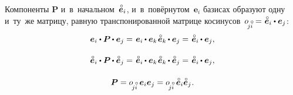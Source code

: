 \begin{otherlanguage}{russian}
\vspace{-0.32em} \noindent {}

Компоненты ${\bm{P}}$ и~в~начальном~${\mathcircabove{\bm{e}}_i}$, и~в~повёрнутом~${\bm{e}_i}$ базисах образуют одну и~ту~же матрицу, равную транспонированной матрице косинусов~${\cosinematrix{\!j\mathcircabove{i}} = \hspace{.12ex} \mathcircabove{\bm{e}}_i \dotp \bm{e}_j}$\hspace{0.1ex}:
\begin{equation}\label{componentsofrotationtensor}
\begin{array}{c}
\bm{e}_i \dotp \bm{P} \hspace{-0.12ex} \dotp \bm{e}_j =
\hspace{0.2ex} \tikzmark{beginEqualsKroneckerDeltaPresent} \bm{e}_i \hspace{-0.1ex} \dotp \bm{e}_k \tikzmark{endEqualsKroneckerDeltaPresent} \hspace{0.2ex} \mathcircabove{\bm{e}}_k \hspace{-0.12ex} \dotp \bm{e}_j =
\hspace{0.2ex} \mathcircabove{\bm{e}}_i \hspace{-0.12ex} \dotp \bm{e}_j , \\[1.4em]
%
\mathcircabove{\bm{e}}_i \dotp \bm{P} \hspace{-0.12ex} \dotp \mathcircabove{\bm{e}}_j =
\hspace{0.2ex} \mathcircabove{\bm{e}}_i \hspace{-0.1ex} \dotp \bm{e}_k \hspace{0.2ex} \tikzmark{beginEqualsKroneckerDeltaPast} \mathcircabove{\bm{e}}_k \hspace{-0.12ex} \dotp \mathcircabove{\bm{e}}_j \tikzmark{endEqualsKroneckerDeltaPast} =
\hspace{0.2ex} \mathcircabove{\bm{e}}_i \hspace{-0.12ex} \dotp \bm{e}_j , \\[1.5em]
%
\bm{P} = \cosinematrix{\!j\mathcircabove{i}} \hspace{0.5ex} {\bm{e}}_i {\bm{e}}_j = \cosinematrix{\!j\mathcircabove{i}} \hspace{0.5ex} \mathcircabove{\bm{e}}_i \mathcircabove{\bm{e}}_j \hspace{0.1ex}.
\end{array}
\end{equation}


\end{otherlanguage}

